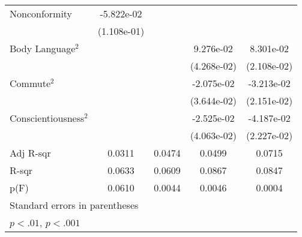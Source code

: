 {\begin{tabular}{l*{4}{c}}
    \addlinespace
    Nonconformity         & -5.822e-02                  &                             &                             &                             \\
                          & (1.108e-01)                 &                             &                             &                             \\
    \addlinespace
    Body Language$^2$     &                             &                             & 9.276e-02                   & 8.301e-02\sym{**}           \\
                          &                             &                             & (4.268e-02)                 & (2.108e-02)                 \\
    \addlinespace
    Commute$^2$           &                             &                             & -2.075e-02                  & -3.213e-02                  \\
                          &                             &                             & (3.644e-02)                 & (2.151e-02)                 \\
    \addlinespace
    Conscientiousness$^2$ &                             &                             & -2.525e-02                  & -4.187e-02                  \\
                          &                             &                             & (4.063e-02)                 & (2.227e-02)                 \\
    \midrule
    Adj R-sqr             & 0.0311                      & 0.0474                      & 0.0499                      & 0.0715                      \\
    R-sqr                 & 0.0633                      & 0.0609                      & 0.0867                      & 0.0847                      \\
    p(F)                  & 0.0610                      & 0.0044                      & 0.0046                      & 0.0004                      \\
    \bottomrule
    \multicolumn{5}{l}{\footnotesize Standard errors in parentheses}                                                                              \\
    \multicolumn{5}{l}{\footnotesize \sym{*} \(p<.01\), \sym{**} \(p<.001\)}                                                                      \\
\end{tabular}
}

